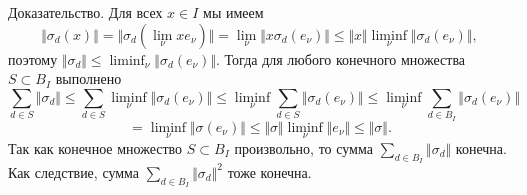 \documentclass[12pt]{article}
\numberwithin{equation}{subsection}
\theoremstyle{plain}
\newenvironment{proof}{Доказательство.}{}
\begin{document}
\begin{fulltext}
\begin{proof}
Для всех $x\in I$ мы имеем
$$
\Vert\sigma_d(x)\Vert=\Vert\sigma_d(\lim_\nu xe_\nu)\Vert
=\lim_\nu\Vert x\sigma_d(e_\nu)\Vert 
\leq\Vert x\Vert\liminf_\nu\Vert\sigma_d(e_\nu)\Vert,
$$ 
поэтому $\Vert\sigma_d\Vert\leq \liminf_\nu\Vert\sigma_d(e_\nu)\Vert$. Тогда для
любого конечного множества $S\subset B_I$ выполнено
$$
\sum_{d\in S}\Vert \sigma_d\Vert
\leq \sum_{d\in S}\liminf_\nu\Vert \sigma_d(e_\nu)\Vert
\leq \liminf_\nu\sum_{d\in S}\Vert \sigma_d(e_\nu)\Vert
\leq \liminf_\nu\sum_{d\in B_I}\Vert \sigma_d(e_\nu) \Vert
$$
$$
=\liminf_{\nu}\Vert\sigma(e_\nu)\Vert
\leq \Vert\sigma\Vert\liminf_{\nu}\Vert e_\nu\Vert
\leq \Vert\sigma\Vert.
$$
Так как конечное множество $S\subset B_I$ произвольно, то сумма $\sum_{d\in
B_I}\Vert\sigma_d\Vert$ конечна. Как следствие, сумма $\sum_{d\in
B_I}\Vert\sigma_d\Vert^2$ тоже конечна. 


\end{proof}
\end{fulltext}
\end{document}
